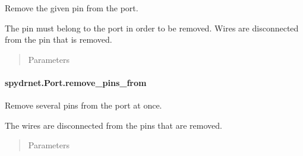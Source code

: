 \documentclass[letterpaper,10pt,english,openany,oneside]{sphinxmanual}
\begin{document}
\begin{fulllineitems}
\label{\detokenize{reference/classes/generated/spydrnet.Port.remove_pin:spydrnet.Port.remove_pin}}
Remove the given pin from the port.

The pin must belong to the port in order to be removed. Wires are disconnected from the pin that is removed.
\begin{quote}\begin{description}
\item[{Parameters}] \leavevmode
{}

\end{description}\end{quote}

\end{fulllineitems}



\paragraph{spydrnet.Port.remove\_pins\_from}
\label{\detokenize{reference/classes/generated/spydrnet.Port.remove_pins_from:spydrnet-port-remove-pins-from}}\label{\detokenize{reference/classes/generated/spydrnet.Port.remove_pins_from::doc}}

\begin{fulllineitems}
\label{\detokenize{reference/classes/generated/spydrnet.Port.remove_pins_from:spydrnet.Port.remove_pins_from}}
Remove several pins from the port at once.

The wires are disconnected from the pins that are removed.
\begin{quote}\begin{description}
\item[{Parameters}] \leavevmode
{}

\end{description}\end{quote}

\end{fulllineitems}
\end{document}
